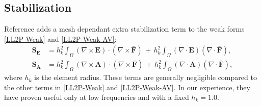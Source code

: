 \subsection{Stabilization}\label{LL2PStab}

Reference \cite{L2P-BE} adds a mesh dependant extra stabilization term to the weak forms \ref{LL2P-Weak} and \ref{LL2P-Weak-AV}: 
\begin{equation}
	\begin{aligned}
		\mathbf{S}_{\mathbf{E}} &= h^{2}_{k}\int_{\Omega}\left(\nabla\times\mathbf{E}\right)\cdot\left(\nabla\times\mathbf{\bar{F}}\right)\, + \,h^{2}_{k}\int_{\Omega}\left(\nabla\cdot\mathbf{E}\right) \left(\nabla\cdot\mathbf{\bar{F}}\right),
		\\
		\mathbf{S}_{\mathbf{A}} &= h^{2}_{k}\int_{\Omega}\left(\nabla\times\mathbf{A}\right)\cdot\left(\nabla\times\mathbf{\bar{F}}\right)\, + \,h^{2}_{k}\int_{\Omega}\left(\nabla\cdot\mathbf{A}\right)\left(\nabla\cdot\mathbf{\bar{F}}\right),
	\end{aligned}
\end{equation}
where $h_{k}$ is the element radius. These terms are generally negligible compared to the other terms in \ref{LL2P-Weak} and \ref{LL2P-Weak-AV}. In our experience, they have proven useful only at low frequencies and with a fixed $h_{k} = 1.0$. 








